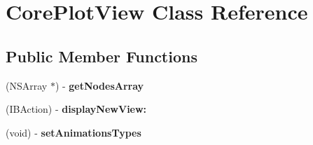 \hypertarget{interface_core_plot_view}{
\section{CorePlotView Class Reference}
\label{interface_core_plot_view}
}
\subsection*{Public Member Functions}
\begin{DoxyCompactItemize}
\item 
\hypertarget{interface_core_plot_view_a3f774b1f1953fcfd0137a6d473f5d588}{
(NSArray $\ast$) -\/ {\bfseries getNodesArray}}
\label{interface_core_plot_view_a3f774b1f1953fcfd0137a6d473f5d588}

\item 
\hypertarget{interface_core_plot_view_a934241cb23168ece99ad9c136e095adf}{
(IBAction) -\/ {\bfseries displayNewView:}}
\label{interface_core_plot_view_a934241cb23168ece99ad9c136e095adf}

\item 
\hypertarget{interface_core_plot_view_add578d0e36de4c53209cb2b83acee48c}{
(void) -\/ {\bfseries setAnimationsTypes}}
\label{interface_core_plot_view_add578d0e36de4c53209cb2b83acee48c}

\end{DoxyCompactItemize}
